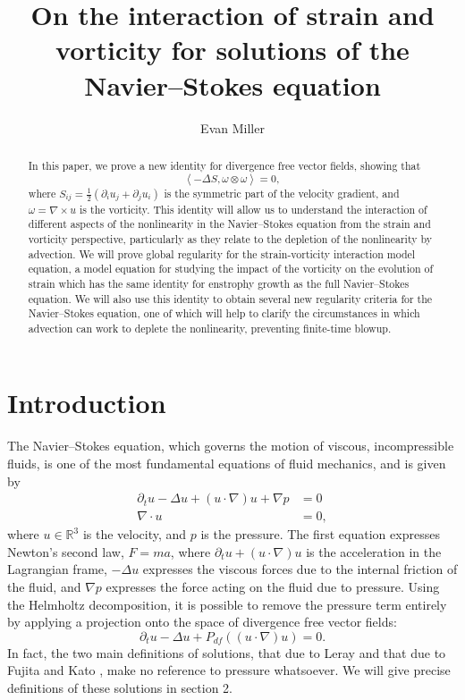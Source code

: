 \documentclass[11pt]{article}
\title{On the interaction of strain and vorticity for solutions of the Navier--Stokes equation}
\author[1]{Evan Miller}
\affil[1]{University of Maine,
evan.miller1@maine.edu}
\theoremstyle{plain}
\theoremstyle{remark}
\numberwithin{equation}{section}
\begin{document}
\maketitle


\begin{abstract}
    In this paper, we prove a new identity for divergence free vector fields, showing that
    \begin{equation*}
    \left<-\Delta S,\omega\otimes\omega\right>
    =0,
    \end{equation*}
    where $S_{ij}=\frac{1}{2}\left(\partial_iu_j
    +\partial_ju_i\right)$ is the symmetric part of the velocity gradient, and $\omega=\nabla\times u$ is the vorticity.
    This identity will allow us to understand the interaction of different aspects of the nonlinearity in the Navier--Stokes equation from the strain and vorticity perspective, particularly as they relate to the depletion of the nonlinearity by advection.
    We will prove global regularity for the strain-vorticity interaction model equation, a model equation for studying the impact of the vorticity on the evolution of strain which has the same identity for enstrophy growth as the full Navier--Stokes equation. We will also use this identity to obtain several new regularity criteria for the Navier--Stokes equation, one of which will help to clarify the circumstances in which advection can work to deplete the nonlinearity, preventing finite-time blowup.
\end{abstract}


\tableofcontents

\section{Introduction}

The Navier--Stokes equation, which governs the motion of viscous, incompressible fluids, is one of the most fundamental equations of fluid mechanics, and is given by
\begin{align}
   \partial_t u- \Delta u+(u\cdot \nabla)u
   +\nabla p&=0 \\ 
   \nabla\cdot u&=0,
\end{align}
where $u\in\mathbb{R}^3$ is the velocity, 
and $p$ is the pressure.
The first equation expresses Newton's second law, $F=ma$,
where $\partial_tu+(u\cdot\nabla)u$ is the acceleration in the Lagrangian frame, $-\Delta u$ expresses the viscous forces due to the internal friction of the fluid, and $\nabla p$ expresses the force acting on the fluid due to pressure.
Using the Helmholtz decomposition, it is possible to remove the pressure term entirely by applying a projection onto the space of divergence free vector fields:
\begin{equation}
   \partial_t u- \Delta u
   +P_{df}\left((u\cdot \nabla)u\right)=0.
\end{equation}
In fact, the two main definitions of solutions, that due to Leray \cite{Leray} and that due to Fujita and Kato \cite{KatoFujita},
make no reference to pressure whatsoever.
We will give precise definitions of these solutions in section 2.
\end{document}
